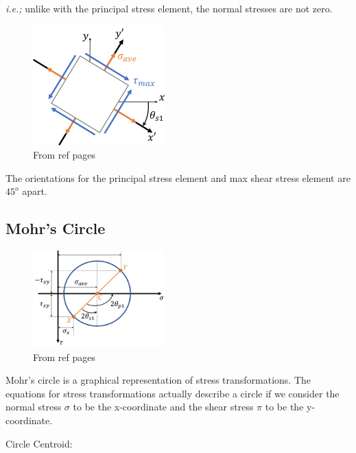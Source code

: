 \noindent \textit{i.e.;} unlike with the principal stress element, the normal stresses are not zero.

\begin{figure}[!h]
\centering
\includegraphics[angle=0, width=2in]{Stress Transformation-Figures/maxShearStressState.png}
\vspace{-2mm}
\caption{\small From ref pages}
\vspace{-3mm}
\label{Fig:MaxShearStressState}
\end{figure}


\noindent The orientations for the principal stress element and max shear stress element are $45^o$
apart.
 
\subsection{Mohr's Circle}

\begin{figure}[!h]
\centering
\includegraphics[angle=0, width=2in]{Stress Transformation-Figures/mohrsCircle.png}
\vspace{-2mm}
\caption{\small From ref pages}
\vspace{-3mm}
\label{Fig:MohrCircle}
\end{figure}

\noindent Mohr's circle is a graphical representation of stress transformations. The equations for stress transformations actually describe a circle if we consider the normal stress $\sigma$ to be the x-coordinate and the shear stress $\pi$ to be the y-coordinate.

\noindent Circle Centroid:

